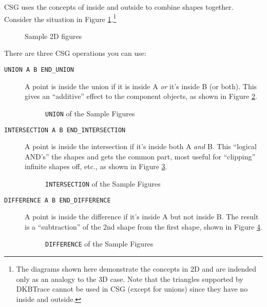 CSG uses the concepts of inside and outside to combine shapes
together. Consider the situation in Figure \ref{csg0}.\footnote{The
diagrams shown here demonstrate the concepts in 2D and are indended
only as an analogy to the 3D case.  Note that the triangles supported
by DKBTrace cannot be used in CSG (except for unions) since they have
no inside and outside.}

\begin{figure}[htbp]
\begin{centering}

\caption{Sample 2D figures}
\label{csg0}
\end{centering}
\end{figure}

There are three CSG operations you can use:

\begin{description}
\item[{\tt UNION A B END_UNION}] A point is inside
the union if it is
inside A {\em or} it's inside B (or both).  This gives an ``additive''
effect to the component objects, as shown in Figure \ref{csg1}.

\begin{figure}[htbp]
\begin{centering}

\caption{{\tt UNION} of the Sample Figures}
\label{csg1}
\end{centering}
\end{figure}

\item[{\tt INTERSECTION A B END_INTERSECTION}] A
point is inside the
intersection if it's inside both A {\em and} B.  This ``logical
AND's'' the shapes and gets the common part, most useful for
``clipping'' infinite shapes off, etc., as shown in Figure \ref{csg2}.

\begin{figure}[htbp]
\begin{centering}

\caption{{\tt INTERSECTION} of the Sample Figures}
\label{csg2}
\end{centering}
\end{figure}

\item[{\tt DIFFERENCE A B END_DIFFERENCE}] A point
is inside the
difference if it's inside A but not inside B.  The result is a
``subtraction'' of the 2nd shape from the first shape, shown in Figure
\ref{csg3}.

\begin{figure}[htbp]
\begin{centering}

\caption{{\tt DIFFERENCE} of the Sample Figures}
\label{csg3}
\end{centering}
\end{figure}
\end{description}

